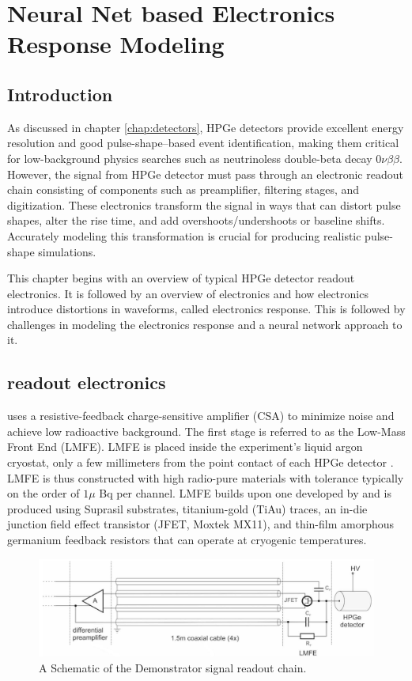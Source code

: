 \chapter{Neural Net based Electronics Response Modeling}
\label{chap:elect_resp}

\section{Introduction}
As discussed in chapter \ref{chap:detectors}, HPGe detectors provide excellent energy resolution and good pulse-shape–based event identification, making them critical for low-background physics searches such as neutrinoless double-beta decay $0\nu\beta\beta$. However, the signal from HPGe detector must pass through an electronic readout chain consisting of components such as preamplifier, filtering stages, and digitization. These electronics transform the signal in ways that can distort pulse shapes, alter the rise time, and add overshoots/undershoots or baseline shifts. Accurately modeling this transformation is crucial for producing realistic pulse-shape simulations.

This chapter begins with an overview of typical HPGe detector readout electronics. It is followed by an overview of {\Ltwo}  electronics and how electronics introduce distortions in waveforms, called electronics response. This is followed by challenges in modeling the electronics response and a neural network approach to it.

\section{{\Ltwo} readout electronics}

{\Ltwo} uses a resistive-feedback charge-sensitive amplifier (CSA) to minimize noise and achieve low radioactive background. The first stage is referred to as the Low-Mass Front End (LMFE). LMFE is placed inside the experiment’s liquid argon cryostat, only a few millimeters from the point contact of each HPGe detector \cite{Willers_2020}. LMFE is thus constructed with high radio-pure materials with tolerance typically on the order of $1\mu$ Bq per channel. LMFE builds upon one developed by {\MJD} and is produced using Suprasil substrates, titanium-gold (TiAu) traces, an in-die junction field effect transistor (JFET, Moxtek MX11), and thin-film amorphous germanium feedback resistors that can operate at cryogenic temperatures. 

\begin{figure}[!htb]%
    \includegraphics[width=0.99\linewidth,trim={1pc 0pc 1pc 0pc},clip]{ch5/figs/l200_elec_diagram.jpg}
    \caption{A Schematic of the Demonstrator signal readout chain.\cite{Willers_2020}}
   \label{fig:l200_elec_model}
\end{figure}


